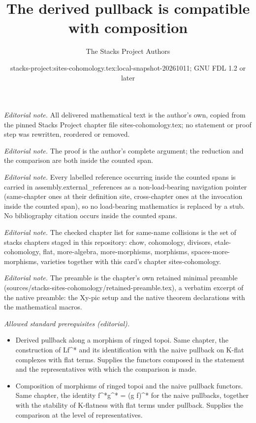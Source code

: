 \documentclass[10pt,a4paper]{amsart}
\title{The derived pullback is compatible with composition}
\author{The Stacks Project Authors}
\date{stacks-project:sites-cohomology.tex:local-snapshot-20261011; GNU FDL 1.2 or later}
\theoremstyle{plain}
\theoremstyle{definition}
\theoremstyle{remark}
\numberwithin{equation}{subsection}
\begin{document}
\maketitle
\noindent\textit{Editorial note.} All delivered mathematical text is the author's own, copied from the pinned Stacks Project chapter file sites-cohomology.tex; no statement or proof step was rewritten, reordered or removed.\par\medskip
\noindent\textit{Editorial note.} The proof is the author's complete argument; the reduction and the comparison are both inside the counted span.\par\medskip
\noindent\textit{Editorial note.} Every labelled reference occurring inside the counted spans is carried in assembly.external\_references as a non-load-bearing navigation pointer (same-chapter ones at their definition site, cross-chapter ones at the invocation inside the counted span), so no load-bearing mathematics is replaced by a stub. No bibliography citation occurs inside the counted spans.\par\medskip
\noindent\textit{Editorial note.} The checked chapter list for same-name collisions is the set of stacks chapters staged in this repository: chow, cohomology, divisors, etale-cohomology, flat, more-algebra, more-morphisms, morphisms, spaces-more-morphisms, varieties together with this card's chapter sites-cohomology.\par\medskip
\noindent\textit{Editorial note.} The preamble is the chapter's own retained minimal preamble (sources/stacks-sites-cohomology/retained-preamble.tex), a verbatim excerpt of the native preamble: the Xy-pic setup and the native theorem declarations with the mathematical macros.\par\medskip
\noindent\textit{Allowed standard prerequisites (editorial).}\begin{itemize}
\item Derived pullback along a morphism of ringed topoi. Same chapter, the construction of Lf\textasciicircum{}* and its identification with the naive pullback on K-flat complexes with flat terms. Supplies the functors composed in the statement and the representatives with which the comparison is made.
\item Composition of morphisms of ringed topoi and the naive pullback functors. Same chapter, the identity f\textasciicircum{}*g\textasciicircum{}* = (g f)\textasciicircum{}* for the naive pullbacks, together with the stability of K-flatness with flat terms under pullback. Supplies the comparison at the level of representatives.
\end{itemize}\medskip
\end{document}
